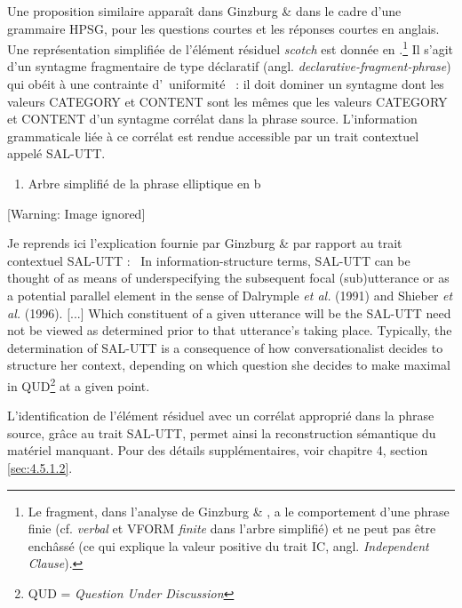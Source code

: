 Une proposition similaire apparaît dans Ginzburg \& \citet{Sag2000} dans le cadre d'une grammaire HPSG, pour les questions courtes et les réponses courtes en anglais. Une représentation simplifiée de l'élément résiduel \textit{scotch} est donnée en .\footnote{Le fragment, dans l'analyse de Ginzburg \& \citet{Sag2000}, a le comportement d'une phrase finie (cf. \textit{verbal}  et VFORM \textit{finite} dans l'arbre simplifié) et ne peut pas être enchâssé (ce qui explique la valeur positive du trait IC, angl. \textit{Independent Clause}).} Il s'agit d'un syntagme fragmentaire de type déclaratif (angl. \textit{declarative-fragment-phrase}) qui obéit à une contrainte d'{\guillemotleft}~uniformité~{\guillemotright} : il doit dominer un syntagme dont les valeurs CATEGORY et CONTENT sont les mêmes que les valeurs CATEGORY et CONTENT d'un syntagme corrélat dans la phrase source. L'information grammaticale liée à ce corrélat est rendue accessible par un trait contextuel appelé SAL-UTT. 


\begin{enumerate}
\item \label{bkm:Ref306142130}Arbre simplifié de la phrase elliptique en b  


\end{enumerate}
{   [Warning: Image ignored] %
} 

Je reprends ici l'explication fournie par Ginzburg \& \citet[301]{Sag2000} par rapport au trait contextuel SAL-UTT : {\guillemotleft}~In information-structure terms, SAL-UTT can be thought of as means of underspecifying the subsequent focal (sub)utterance or as a potential parallel element in the sense of Dalrymple \textit{et al.} (1991) and Shieber \textit{et al.} (1996). [...] Which constituent of a given utterance will be the SAL-UTT need not be viewed as determined prior to that utterance's taking place. Typically, the determination of SAL-UTT is a consequence of how conversationalist decides to structure her context, depending on which question she decides to make maximal in QUD\footnote{QUD = \textit{Question Under Discussion}} at a given point.~{\guillemotright} 

L'identification de l'élément résiduel avec un corrélat approprié dans la phrase source, grâce au trait SAL-UTT, permet ainsi la reconstruction sémantique du matériel manquant. Pour des détails supplémentaires, voir chapitre 4, section \ref{sec:4.5.1.2}.

